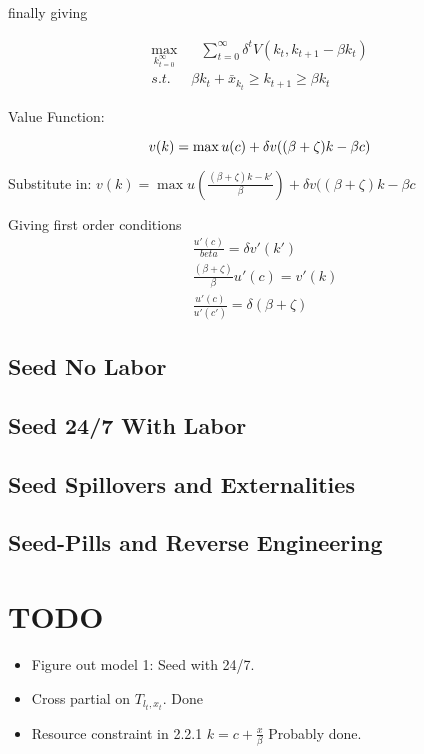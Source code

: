 \documentclass[11pt]{article}
\begin{document}
  finally giving

  \begin{align}
    \max_{k_{t=0}^\infty} & \ \ \ \sum_{t=0}^{\infty} \delta^t V(k_t, k_{t+1} - \beta k_t)\\
    s.t. \ \ \ & \beta k_t + \bar{x}_{k_t} \geq k_{t+1} \geq \beta k_t
  \end{align}

  Value Function:

  \begin{equation}
    v(k) = \max u(c) + \delta v((\beta + \zeta)k - \beta c)\\
  \end{equation}
  
  Substitute in:
    $v(k) = \max u(\frac{(\beta + \zeta)k - k'}{\beta}) + \delta v((\beta + \zeta)k - \beta c$
    
  Giving first order conditions
  \begin{align}
    &\frac{u'(c)}{beta} = \delta v'(k')\\
    &\frac{(\beta + \zeta)}{\beta} u'(c) = v'(k)\\
    &\frac{u'(c)}{u'(c')} = \delta(\beta + \zeta)
  \end{align}

\subsection{Seed No Labor}
\label{sub:seed_no_labor}

\subsection{Seed 24/7 With Labor}
\label{sub:seed_24_7_with_labor}

\subsection{Seed Spillovers and Externalities}
\label{sub:seed_spillovers_and_externalities}

\subsection{Seed-Pills and Reverse Engineering}
\label{sub:seed_pills_and_reverse_engineering}

\section{TODO}
\label{sec:todo}

  \begin{itemize}
    \item Figure out model 1: Seed with 24/7.
    \item Cross partial on $T_{l_t,x_t}$. Done
    \item Resource constraint in 2.2.1 $k = c + \frac{x}{\beta}$ Probably done.
  \end{itemize}
  
\end{document}
